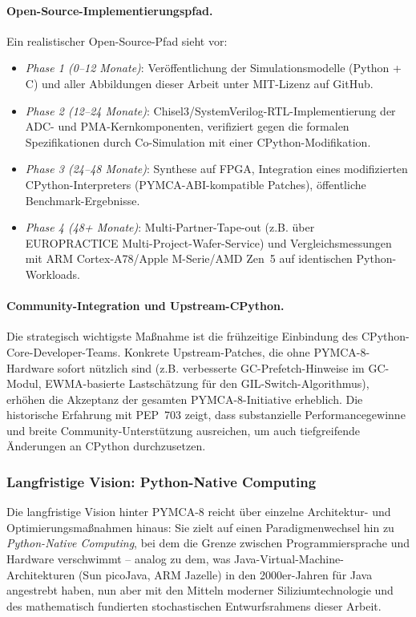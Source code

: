 ﻿\documentclass[a4paper,12pt]{scrreprt}
\theoremstyle{definition}
\begin{document}
	\paragraph{Open-Source-Implementierungspfad.}
	Ein realistischer Open-Source-Pfad sieht vor:
	\begin{itemize}[noitemsep]
		\item \emph{Phase 1 (0--12 Monate)}: Veröffentlichung der Simulationsmodelle
		(Python + C) und aller Abbildungen dieser Arbeit unter MIT-Lizenz auf GitHub.
		\item \emph{Phase 2 (12--24 Monate)}: Chisel3/SystemVerilog-RTL-Implementierung
		der ADC- und PMA-Kernkomponenten, verifiziert gegen die formalen Spezifikationen
		durch Co-Simulation mit einer CPython-Modifikation.
		\item \emph{Phase 3 (24--48 Monate)}: Synthese auf FPGA, Integration eines
		modifizierten CPython-Interpreters (PYMCA-ABI-kompatible Patches), öffentliche
		Benchmark-Ergebnisse.
		\item \emph{Phase 4 (48+ Monate)}: Multi-Partner-Tape-out (z.B. über EUROPRACTICE
		Multi-Project-Wafer-Service) und Vergleichsmessungen mit ARM Cortex-A78/Apple
		M-Serie/AMD Zen~5 auf identischen Python-Workloads.
	\end{itemize}

	\paragraph{Community-Integration und Upstream-CPython.}
	Die strategisch wichtigste Maßnahme ist die frühzeitige Einbindung des
	CPython-Core-Developer-Teams. Konkrete Upstream-Patches, die ohne PYMCA-8-Hardware
	sofort nützlich sind (z.B. verbesserte GC-Prefetch-Hinweise im GC-Modul,
	EWMA-basierte Lastschätzung für den GIL-Switch-Algorithmus), erhöhen die
	Akzeptanz der gesamten PYMCA-8-Initiative erheblich. Die historische Erfahrung
	mit PEP~703 zeigt, dass substanzielle Performancegewinne und breite
	Community-Unterstützung ausreichen, um auch tiefgreifende Änderungen an
	CPython durchzusetzen.

	\subsubsection{Langfristige Vision: Python-Native Computing}

	Die langfristige Vision hinter PYMCA-8 reicht über einzelne Architektur-
	und Optimierungsmaßnahmen hinaus: Sie zielt auf einen Paradigmenwechsel
	hin zu \emph{Python-Native Computing}, bei dem die Grenze zwischen
	Programmiersprache und Hardware verschwimmt -- analog zu dem, was
	Java-Virtual-Machine-Architekturen (Sun picoJava, ARM Jazelle) in den
	2000er-Jahren für Java angestrebt haben, nun aber mit den Mitteln moderner
	Siliziumtechnologie und des mathematisch fundierten stochastischen
	Entwurfsrahmens dieser Arbeit.
\end{document}
